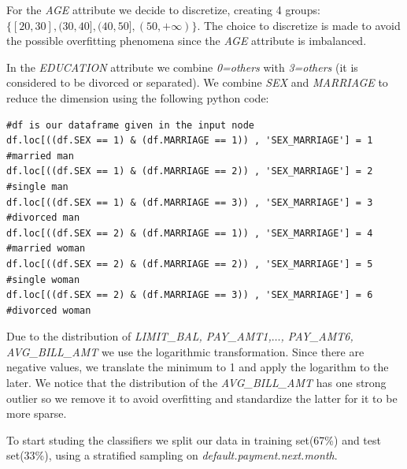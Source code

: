 \documentclass[fleqn,10pt]{SelfArx} %
\begin{document}
	For the \textit{AGE} attribute we decide to discretize, creating 4 groups: $\{[20,30],(30,40],(40,50],(50,+\infty)\}$.
	The choice to discretize is made to avoid the possible overfitting phenomena since the \textit{AGE} attribute is imbalanced.
	
	In the \textit{EDUCATION} attribute we combine \textit{0=others} with \textit{3=others} (it is considered to be divorced or separated).
	We combine \textit{SEX} and \textit{MARRIAGE} to reduce the dimension using the following python code:
	
		
\begin{lstlisting}
#df is our dataframe given in the input node
df.loc[((df.SEX == 1) & (df.MARRIAGE == 1)) , 'SEX_MARRIAGE'] = 1 #married man
df.loc[((df.SEX == 1) & (df.MARRIAGE == 2)) , 'SEX_MARRIAGE'] = 2 #single man
df.loc[((df.SEX == 1) & (df.MARRIAGE == 3)) , 'SEX_MARRIAGE'] = 3 #divorced man
df.loc[((df.SEX == 2) & (df.MARRIAGE == 1)) , 'SEX_MARRIAGE'] = 4 #married woman
df.loc[((df.SEX == 2) & (df.MARRIAGE == 2)) , 'SEX_MARRIAGE'] = 5 #single woman
df.loc[((df.SEX == 2) & (df.MARRIAGE == 3)) , 'SEX_MARRIAGE'] = 6 #divorced woman
\end{lstlisting}
	
	Due to the distribution of \textit{LIMIT\_BAL, PAY\_AMT1,$\hdots$, PAY\_AMT6, AVG\_BILL\_AMT} we use the logarithmic transformation. Since there are negative values, we translate the minimum to 1 and apply the logarithm to the later. We notice that the distribution of the \textit{AVG\_BILL\_AMT} has one strong outlier so we remove it to avoid overfitting and standardize the latter for it to be more sparse.
	
	To start studing the classifiers we split our data in training set(67\%) and test set(33\%), using a stratified sampling on \textit{default.payment.next.month}.
	
\end{document}
